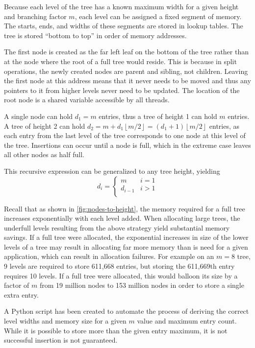 Because each level of the tree has a known maximum width for a given height and
branching factor $m$, each level can be assigned a fixed segment of memory. The
starts, ends, and widths of these segments are stored in lookup tables. The tree
is stored ``bottom to top'' in order of memory addresses.

The first node is created as the far left leaf on the bottom of the tree rather
than at the node where the root of a full tree would reside. This is because in
split operations, the newly created nodes are parent and sibling, not children.
Leaving the first node at this address means that it never needs to be moved and
thus any pointers to it from higher levels never need to be updated. The
location of the root node is a shared variable accessible by all threads.

A single node can hold $d_1=m$ entries, thus a tree of height 1 can hold $m$
entries. A tree of height 2 can hold $d_2 = m + d_1\left\lfloor{m/2}\right\rfloor= 
(d_1+1)\left\lfloor{m/2}\right\rfloor$ entries, as each entry from the last
level of the tree corresponds to one node at this level of the tree. Insertions
can occur until a node is full, which in the extreme case leaves all
other nodes as half full.

This recursive expression can be generalized to any tree height, yielding
{\ssp$$
	d_i = \begin{cases}
		m & i = 1 \\
		d_{i-1} & i > 1 \\
	\end{cases}
$$}

Recall that as shown in \autoref{fig:nodes-to-height}, the memory required for a
full tree increases exponentially with each level added. When allocating large
trees, the underfull levels resulting from the above strategy yield substantial
memory savings. If a full tree were allocated, the exponential increases in size
of the lower levels of a tree may result in allocating far more memory than is
need for a given application, which can result in allocation failures.
%
For example on an $m=8$ tree, 9 levels are required to store 611,668 entries,
but storing the 611,669th entry requires 10 levels. If a full tree were
allocated, this would balloon its size by a factor of $m$ from 19 million nodes
to 153 million nodes in order to store a single extra entry.

A Python script has been created to automate the process of deriving the correct
level widths and memory size for a given $m$ value and maximum entry count.
While it is possible to store more than the given entry maximum, it is not
successful insertion is not guaranteed.


